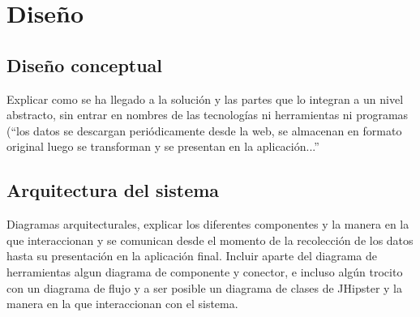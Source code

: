 \chapter{Diseño}  \label{disenyo}
\section{Diseño conceptual} \label{disenyo.conceptual}
Explicar como se ha llegado a la solución y las partes que lo integran a un nivel abstracto, sin entrar en nombres de las tecnologías ni herramientas ni programas (“los datos se descargan periódicamente desde la web, se almacenan en formato original luego se transforman y se presentan en la aplicación...”
\section{Arquitectura del sistema} \label{disenyo.arquitectura}
Diagramas arquitecturales, explicar los diferentes componentes y la manera en la que interaccionan y se comunican desde el momento de la recolección de los datos hasta su presentación en la aplicación final. Incluir aparte del diagrama de herramientas algun diagrama de componente y conector, e incluso algún trocito con un diagrama de flujo y a ser posible un diagrama de clases de JHipster y la manera en la que interaccionan con el sistema.

